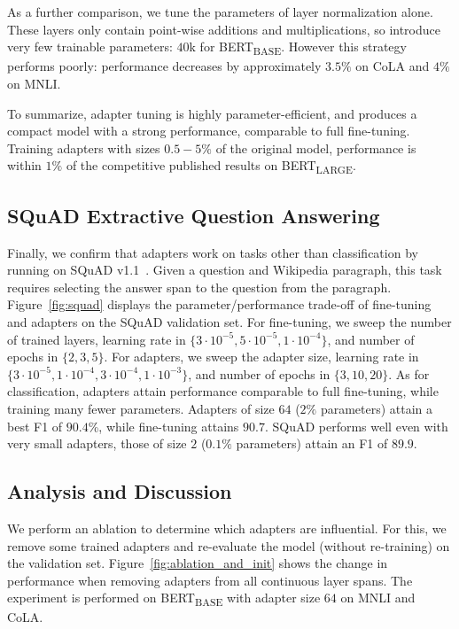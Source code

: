 As a further comparison, we tune the parameters of layer normalization alone. These layers only contain point-wise additions and multiplications, so introduce very few trainable parameters: $40$k for BERT\textsubscript{BASE}.
However this strategy performs poorly: performance decreases by approximately $3.5\%$ on CoLA and $4\%$ on MNLI.

To summarize, adapter tuning is highly parameter-efficient, and produces a compact model with a strong performance, comparable to full fine-tuning. Training adapters with sizes $0.5-5\%$ of the original model, performance is within $1\%$ of the competitive published results on BERT\textsubscript{LARGE}.

\subsection{SQuAD Extractive Question Answering}

Finally, we confirm that adapters work on tasks other than classification by running on SQuAD v1.1~\citep{rajpurkar2018}. Given a question and Wikipedia paragraph, this task requires selecting the answer span to the question from the paragraph.
Figure~\ref{fig:squad} displays the parameter/performance trade-off of fine-tuning and adapters on the SQuAD validation set. For fine-tuning, we sweep the number of trained layers, learning rate in $\{3\cdot 10^{-5}, 5\cdot 10^{-5}, 1\cdot 10^{-4}\}$, and number of epochs in $\{2,3,5\}$.
For adapters, we sweep the adapter size, learning rate in $\{3\cdot 10^{-5}, 1\cdot 10^{-4}, 3\cdot 10^{-4}, 1\cdot 10^{-3}\}$, and number of epochs in $\{3,10,20\}$.
As for classification, adapters attain performance comparable to full fine-tuning, while training many fewer parameters. Adapters of size $64$ ($2\%$ parameters) attain a best F1 of $90.4$\%, while fine-tuning attains $90.7$. SQuAD performs well even with very small adapters, those of size $2$ ($0.1\%$ parameters) attain an F1 of $89.9$.

\subsection{Analysis and Discussion\label{sec:discussion}}

We perform an ablation to determine which adapters are influential. For this, we remove some trained adapters and re-evaluate the model (without re-training) on the validation set.
Figure~\ref{fig:ablation_and_init} shows the change in performance when removing adapters from all continuous layer spans. The experiment is performed on BERT\textsubscript{BASE} with adapter size $64$ on MNLI and CoLA.

